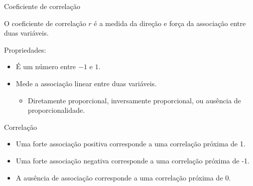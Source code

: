 \documentclass{beamer}
\begin{document}
\begin{frame}{\scriptsize Coeficiente de correlação}
  \begin{definition}
    O coeficiente de correlação $r$ é a medida da direção e força da
    associação entre duas variáveis.
  \end{definition}
  Propriedades:
  \begin{itemize}
    \footnotesize
  \item É um número entre $-1$ e $1$.
    \bigskip
  \item Mede a associação \alert{linear} entre duas variáveis.
    \begin{itemize}
      \scriptsize
    \item Diretamente proporcional, inversamente proporcional, ou
      ausência de proporcionalidade.
    \end{itemize}
  \end{itemize}
\end{frame}


\begin{frame}{\scriptsize Correlação}
  \begin{block}{}
    \footnotesize
    \begin{itemize}
    \footnotesize
    \item Uma forte associação \alert<2>{positiva} corresponde a uma correlação
      próxima de \alert<2>{1}.
      \bigskip
    \item Uma forte associação \alert<3>{negativa} corresponde a uma correlação
      próxima de \alert<3>{-1}.
      \bigskip
    \item A \alert<4>{ausência} de associação corresponde a uma
      correlação próxima de \alert<4>{0}.
    \end{itemize}
  \end{block}
\end{frame}
\end{document}
